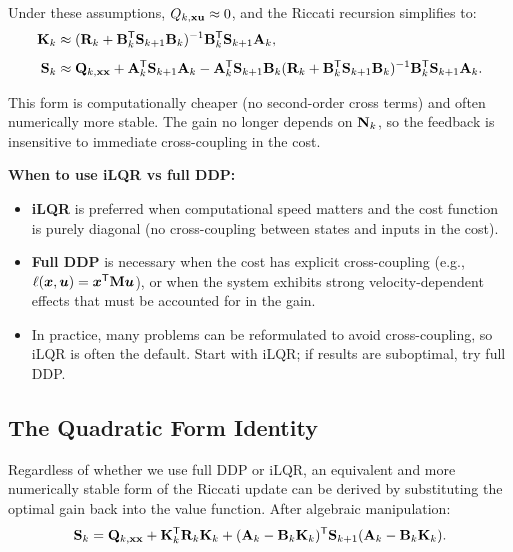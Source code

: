 Under these assumptions, $Q_{k,\mathbf{x}\mathbf{u}} \approx 0$, and the Riccati recursion simplifies to:
\begin{align}
\mathbf{K}_k &\approx (\mathbf{R}_k + \mathbf{B}_k^{\mathsf{T}}\mathbf{S}_{k+1}\mathbf{B}_k)^{-1}\mathbf{B}_k^{\mathsf{T}}\mathbf{S}_{k+1}\mathbf{A}_k, \label{eq:ch5:gain-ilqr}\\[4pt]
\mathbf{S}_k &\approx \mathbf{Q}_{k,\mathbf{x}\mathbf{x}} + \mathbf{A}_k^{\mathsf{T}}\mathbf{S}_{k+1}\mathbf{A}_k - \mathbf{A}_k^{\mathsf{T}}\mathbf{S}_{k+1}\mathbf{B}_k
(\mathbf{R}_k + \mathbf{B}_k^{\mathsf{T}}\mathbf{S}_{k+1}\mathbf{B}_k)^{-1}\mathbf{B}_k^{\mathsf{T}}\mathbf{S}_{k+1}\mathbf{A}_k. \label{eq:ch5:riccati-ilqr}
\end{align}

This form is computationally cheaper (no second-order cross terms) and often numerically more stable. The gain
no longer depends on $\mathbf{N}_k$, so the feedback is insensitive to immediate cross-coupling in the cost.

\begin{designbox}
\textbf{When to use iLQR vs full DDP:}
\begin{itemize}
\item \textbf{iLQR} is preferred when computational speed matters and the cost function is purely diagonal
      (no cross-coupling between states and inputs in the cost).
\item \textbf{Full DDP} is necessary when the cost has explicit cross-coupling (e.g., $\ell(\bm{x},\bm{u}) = \bm{x}^{\mathsf{T}}\mathbf{M}\bm{u}$),
      or when the system exhibits strong velocity-dependent effects that must be accounted for in the gain.
\item In practice, many problems can be reformulated to avoid cross-coupling, so iLQR is often the default.
      Start with iLQR; if results are suboptimal, try full DDP.
\end{itemize}
\end{designbox}

\subsection{The Quadratic Form Identity}

Regardless of whether we use full DDP or iLQR, an equivalent and more numerically stable form of the Riccati
update can be derived by substituting the optimal gain back into the value function. After algebraic manipulation:
\begin{equation}
\mathbf{S}_k = \mathbf{Q}_{k,\mathbf{x}\mathbf{x}} + \mathbf{K}_k^{\mathsf{T}}\mathbf{R}_k\mathbf{K}_k
+ (\mathbf{A}_k - \mathbf{B}_k\mathbf{K}_k)^{\mathsf{T}}\mathbf{S}_{k+1}(\mathbf{A}_k - \mathbf{B}_k\mathbf{K}_k).
\label{eq:ch5:riccati-alt}
\end{equation}

